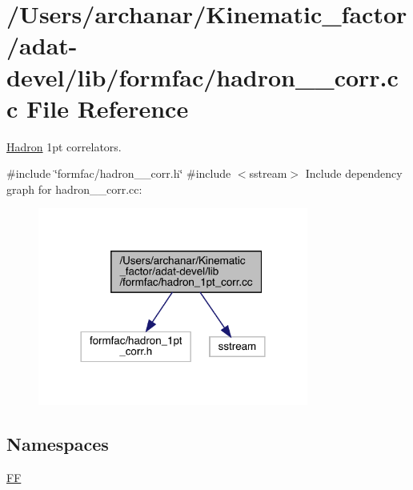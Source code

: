 \hypertarget{adat-devel_2lib_2formfac_2hadron__1pt__corr_8cc}{}\section{/\+Users/archanar/\+Kinematic\+\_\+factor/adat-\/devel/lib/formfac/hadron\+\_\+1pt\+\_\+corr.cc File Reference}
\label{adat-devel_2lib_2formfac_2hadron__1pt__corr_8cc}


\mbox{\hyperlink{namespaceHadron}{Hadron}} 1pt correlators.  


{\ttfamily \#include \char`\"{}formfac/hadron\+\_\+1pt\+\_\+corr.\+h\char`\"{}}\newline
{\ttfamily \#include $<$sstream$>$}\newline
Include dependency graph for hadron\+\_\+1pt\+\_\+corr.\+cc\+:
\nopagebreak
\begin{figure}[H]
\begin{center}
\leavevmode
\includegraphics[width=252pt]{db/d9b/adat-devel_2lib_2formfac_2hadron__1pt__corr_8cc__incl}
\end{center}
\end{figure}
\subsection*{Namespaces}
\begin{DoxyCompactItemize}
\item 
 \mbox{\hyperlink{namespaceFF}{FF}}
\end{DoxyCompactItemize}
